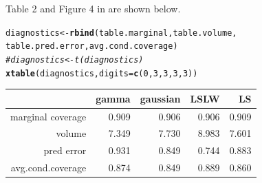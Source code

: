 \documentclass[11pt]{article}\usepackage[]{graphicx}\usepackage[]{color}
\makeatletter
\newcommand{\hlnum}[1]{\textcolor[rgb]{0.686,0.059,0.569}{#1}}%
\newcommand{\hlcom}[1]{\textcolor[rgb]{0.678,0.584,0.686}{\textit{#1}}}%
\newcommand{\hlstd}[1]{\textcolor[rgb]{0.345,0.345,0.345}{#1}}%
\newcommand{\hlkwb}[1]{\textcolor[rgb]{0.69,0.353,0.396}{#1}}%
\newcommand{\hlkwc}[1]{\textcolor[rgb]{0.333,0.667,0.333}{#1}}%
\newcommand{\hlkwd}[1]{\textcolor[rgb]{0.737,0.353,0.396}{\textbf{#1}}}%
\newenvironment{kframe}{%
 \def\at@end@of@kframe{}%
 \ifinner\ifhmode%
  \def\at@end@of@kframe{\end{minipage}}%
  \begin{minipage}{\columnwidth}%
 \fi\fi%
 \def\FrameCommand##1{\hskip\@totalleftmargin \hskip-\fboxsep
 \colorbox{shadecolor}{##1}\hskip-\fboxsep
     \hskip-\linewidth \hskip-\@totalleftmargin \hskip\columnwidth}%
 \MakeFramed {\advance\hsize-\width
   \@totalleftmargin\z@ \linewidth\hsize
   \@setminipage}}%
 {\par\unskip\endMakeFramed%
 \at@end@of@kframe}
\makeatother
\begin{document}
Table 2 and Figure 4 in \citet{eck2019conformal} are shown below. 


\begin{kframe}
\begin{alltt}
\hlstd{diagnostics} \hlkwb{<-} \hlkwd{rbind}\hlstd{(table.marginal, table.volume,}
  \hlstd{table.pred.error, avg.cond.coverage)}
\hlcom{#diagnostics <- t(diagnostics)}
\hlkwd{xtable}\hlstd{(diagnostics,} \hlkwc{digits} \hlstd{=} \hlkwd{c}\hlstd{(}\hlnum{0}\hlstd{,} \hlnum{3}\hlstd{,} \hlnum{3}\hlstd{,} \hlnum{3}\hlstd{,} \hlnum{3}\hlstd{))}
\end{alltt}
\end{kframe}%
\begin{table}[ht]
\centering
\begin{tabular}{rrrrr}
  \hline
 & gamma & gaussian & LSLW & LS \\ 
  \hline
marginal coverage & 0.909 & 0.906 & 0.906 & 0.909 \\ 
  volume & 7.349 & 7.730 & 8.983 & 7.601 \\ 
  pred error & 0.931 & 0.849 & 0.744 & 0.883 \\ 
  avg.cond.coverage & 0.874 & 0.849 & 0.889 & 0.860 \\ 
   \hline
\end{tabular}
\end{table}
\end{document}
